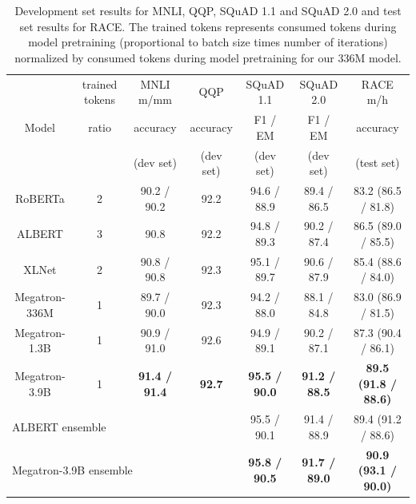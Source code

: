 \begin{table}
\footnotesize
\begin{center}
\caption{Development set results for MNLI, QQP, SQuAD 1.1 and SQuAD 2.0 and test set results for RACE. The trained tokens represents consumed tokens during model pretraining (proportional to batch size times number of iterations) normalized by consumed tokens during model pretraining for our 336M model.}
\label{tab:bert_results}
\begin{tabular}{c|c|c|c|c|c||c} \hline \hline
\multirow{3}{*}{Model}         & trained tokens & MNLI m/mm         & QQP       & SQuAD 1.1         & SQuAD 2.0        & RACE m/h         \\
              & ratio        & accuracy         & accuracy  & F1 / EM            & F1 / EM          & accuracy         \\
                  &        & (dev set)         & (dev set)  & (dev set)           & (dev set)          & (test set)         \\\hline
RoBERTa \cite{roberta}       & 2              & 90.2 / 90.2      & 92.2      & 94.6 / 88.9        & 89.4 / 86.5      & 83.2 (86.5 / 81.8)      \\
ALBERT \cite{ALBERT2019}        & 3              & 90.8             & 92.2      & 94.8 / 89.3        & 90.2 / 87.4      & 86.5 (89.0 / 85.5)      \\
XLNet \cite{xlnet}       & 2              & 90.8 / 90.8      & 92.3      & 95.1 / 89.7   & 90.6 / 87.9      & 85.4 (88.6 / 84.0)      \\
Megatron-336M & 1              & 89.7 / 90.0      & 92.3      & 94.2 / 88.0        & 88.1 / 84.8      & 83.0 (86.9 / 81.5)      \\
Megatron-1.3B & 1              & 90.9 / 91.0      & 92.6      & 94.9 / 89.1        & 90.2 / 87.1      & 87.3 (90.4 / 86.1)      \\
Megatron-3.9B & 1           & \bf{91.4 / 91.4} & \bf{92.7} & \bf{95.5 / 90.0} & \bf{91.2 / 88.5} & \bf{89.5 (91.8 / 88.6)} \\\hline
 \multicolumn{3}{l}{ALBERT ensemble \cite{ALBERT2019} } & & 95.5 / 90.1 &91.4 / 88.9 & 89.4 (91.2 / 88.6)\\
  \multicolumn{3}{l}{Megatron-3.9B ensemble} &  &  \bf{95.8 / 90.5} & \bf{91.7 / 89.0} & \bf{90.9 (93.1 / 90.0)}\\\hline 
\end{tabular}
\end{center}
\end{table}

